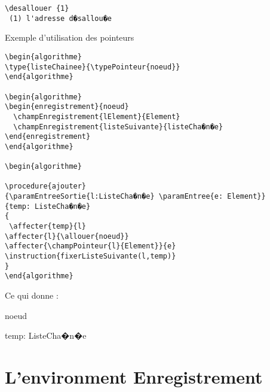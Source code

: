\documentclass[a4paper,12pt]{report}
\begin{document}
{\begin{itemize}
\begin{lstlisting}
\desallouer {1}
 (1) l'adresse d�sallou�e
\end{lstlisting}
\end{itemize}


Exemple d'utilisation des pointeurs


\begin{lstlisting}
\begin{algorithme}
\type{listeChainee}{\typePointeur{noeud}}
\end{algorithme}

\begin{algorithme}
\begin{enregistrement}{noeud}
  \champEnregistrement{lElement}{Element}
  \champEnregistrement{listeSuivante}{listeCha�n�e}
\end{enregistrement}
\end{algorithme}

\begin{algorithme}

\procedure{ajouter}
{\paramEntreeSortie{l:ListeCha�n�e} \paramEntree{e: Element}}
{temp: ListeCha�n�e}
{
 \affecter{temp}{l}
\affecter{l}{\allouer{noeud}}
\affecter{\champPointeur{l}{Element}}{e}
\instruction{fixerListeSuivante(l,temp)}
}
\end{algorithme}
\end{lstlisting}

Ce qui donne :
\begin{algorithme}
\end{algorithme}

\begin{algorithme}
\begin{enregistrement}{noeud}
\end{enregistrement}
\end{algorithme}

\begin{algorithme}

{ }
{temp: ListeCha�n�e}
{

}

\end{algorithme}

\section{L'environment Enregistrement}

}
\end{document}
